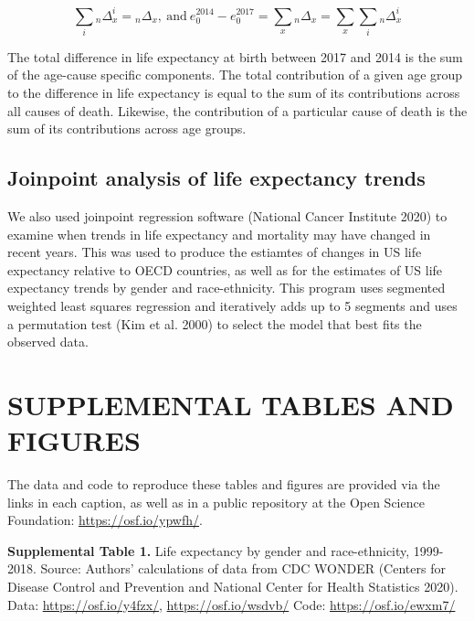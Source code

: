 \documentclass[
  11pt,
]{article}
\begin{document}
\[
\sum_{i}{}_{n}\Delta_{x}^{i}={}_{n}\Delta_{x},\:\textrm{and}\:e_{0}^{2014}-e_{0}^{2017}=\sum_{x}{}_{n}\Delta_{x}=\sum_{x}\sum_{i}{}_{n}\Delta_{x}^{i}
\]

The total difference in life expectancy at birth between 2017 and 2014
is the sum of the age-cause specific components. The total contribution
of a given age group to the difference in life expectancy is equal to
the sum of its contributions across all causes of death. Likewise, the
contribution of a particular cause of death is the sum of its
contributions across age groups.

\hypertarget{joinpoint-analysis-of-life-expectancy-trends}{%
\subsection{\textbar{} Joinpoint analysis of life expectancy
trends}\label{joinpoint-analysis-of-life-expectancy-trends}}

We also used joinpoint regression software (National Cancer Institute
2020) to examine when trends in life expectancy and mortality may have
changed in recent years. This was used to produce the estiamtes of
changes in US life expectancy relative to OECD countries, as well as for
the estimates of US life expectancy trends by gender and race-ethnicity.
This program uses segmented weighted least squares regression and
iteratively adds up to 5 segments and uses a permutation test (Kim et
al. 2000) to select the model that best fits the observed data.

\hypertarget{supplemental-tables-and-figures}{%
\section{\textbar{} SUPPLEMENTAL TABLES AND
FIGURES}\label{supplemental-tables-and-figures}}

The data and code to reproduce these tables and figures are provided via
the links in each caption, as well as in a public repository at the Open
Science Foundation: \url{https://osf.io/ypwfh/}.

\newpage

\textbf{Supplemental Table 1.} Life expectancy by gender and
race-ethnicity, 1999-2018. Source: Authors' calculations of data from
CDC WONDER (Centers for Disease Control and Prevention and National
Center for Health Statistics 2020). Data: \url{https://osf.io/y4fzx/},
\url{https://osf.io/wsdvb/} Code: \url{https://osf.io/ewxm7/}
\end{document}
